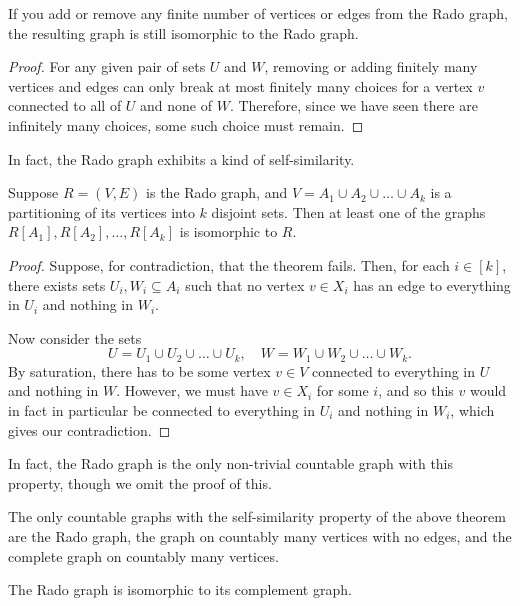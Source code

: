 \documentclass[nobib]{tufte-handout}
\begin{document}
\begin{corollary}
    If you add or remove any finite number of vertices or edges from the Rado graph, the resulting graph is still isomorphic to the Rado graph.

    \begin{proof}
        For any given pair of sets $U$ and $W$, removing or adding finitely many vertices and edges can only break at most finitely many choices for a vertex $v$ connected to all of $U$ and none of $W$. Therefore, since we have seen there are infinitely many choices, some such choice must remain.
    \end{proof}
\end{corollary}

In fact, the Rado graph exhibits a kind of self-similarity.

\begin{theorem}
    Suppose $R = (V,E)$ is the Rado graph, and $V = A_1 \cup A_2 \cup \ldots \cup A_k$ is a partitioning of its vertices into $k$ disjoint sets. Then at least one of the graphs $R[A_1], R[A_2], \ldots, R[A_k]$ is isomorphic to $R$.

    \begin{proof}
        Suppose, for contradiction, that the theorem fails. Then, for each $i \in [k]$, there exists sets $U_i, W_i \subseteq A_i$ such that no vertex $v \in X_i$ has an edge to everything in $U_i$ and nothing in $W_i$.

        Now consider the sets
        $$U = U_1 \cup U_2 \cup \ldots \cup U_k, \quad W = W_1 \cup W_2 \cup \ldots \cup W_k.$$
        By saturation, there has to be some vertex $v \in V$ connected to everything in $U$ and nothing in $W$. However, we must have $v \in X_i$ for some $i$, and so this $v$ would in fact in particular be connected to everything in $U_i$ and nothing in $W_i$, which gives our contradiction.
    \end{proof}
\end{theorem}

In fact, the Rado graph is the only non-trivial countable graph with this property, though we omit the proof of this.

\begin{proposition}
    The only countable graphs with the self-similarity property of the above theorem are the Rado graph, the graph on countably many vertices with no edges, and the complete graph on countably many vertices.
\end{proposition}

\begin{remark}
    The Rado graph is isomorphic to its complement graph.
\end{remark}
\end{document}
